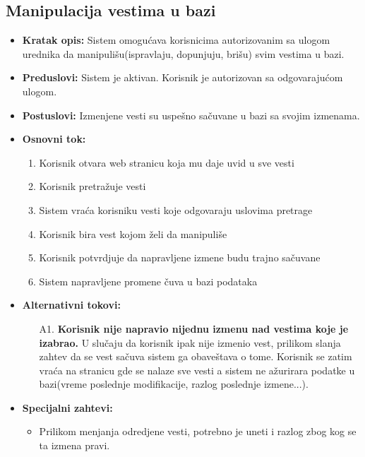 \documentclass{article}
\begin{document}
\newpage

\subsection{Manipulacija vestima u bazi}
\begin{itemize}
    \item \textbf{Kratak opis:} Sistem omogućava korisnicima autorizovanim sa ulogom urednika da manipulišu(ispravlaju, dopunjuju, brišu) svim vestima u bazi.
    \item \textbf{Preduslovi:} Sistem je aktivan. Korisnik je autorizovan sa odgovarajućom ulogom. 
    \item \textbf{Postuslovi:} Izmenjene vesti su uspešno sačuvane u bazi sa svojim izmenama.
    \item \textbf{Osnovni tok:}
        \begin{enumerate}
            \item Korisnik otvara web stranicu koja mu daje uvid u sve vesti
	        \item Korisnik pretražuje vesti
	        \item Sistem vraća korisniku vesti koje odgovaraju uslovima pretrage
	        \item Korisnik bira vest kojom želi da manipuliše
	        \item Korisnik potvrdjuje da napravljene izmene budu trajno sačuvane
	        \item Sistem napravljene promene čuva u bazi podataka
	    \end{enumerate}
    \item \textbf{Alternativni tokovi:}
        \begin{itemize}
            \item[A1.] \textbf{Korisnik nije napravio nijednu izmenu nad vestima koje je izabrao.} U slučaju da korisnik ipak nije izmenio vest, prilikom slanja zahtev da se vest sačuva sistem ga obaveštava o tome. Korisnik se zatim vraća na stranicu gde se nalaze sve vesti a sistem ne ažurirara podatke u bazi(vreme poslednje modifikacije, razlog poslednje izmene...).
        \end{itemize}
    \item \textbf{Specijalni zahtevi:}
        \begin{itemize}
			\item Prilikom menjanja odredjene vesti, potrebno je uneti i razlog zbog kog se ta izmena pravi.
		\end{itemize}
\end{itemize}
\end{document}
